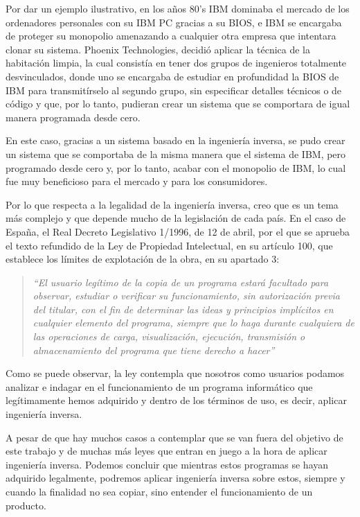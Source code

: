 Por dar un ejemplo ilustrativo, en los años 80's IBM dominaba el mercado de los ordenadores personales
con su IBM PC gracias a su BIOS, e IBM se encargaba de proteger su monopolio amenazando a cualquier otra
empresa que intentara clonar su sistema. Phoenix Technologies, decidió aplicar la técnica de la habitación
limpia, la cual consistía en tener dos grupos de ingenieros totalmente desvinculados, donde uno se encargaba
de estudiar en profundidad la BIOS de IBM para transmitírselo al segundo grupo, sin especificar detalles
técnicos o de código y que, por lo tanto, pudieran crear un sistema que se comportara de igual manera programada
desde cero. \cite{IngenieriaInversa}

En este caso, gracias a un sistema basado en la ingeniería inversa, se pudo crear un sistema que se comportaba
de la misma manera que el sistema de IBM, pero programado desde cero y, por lo tanto, acabar con el monopolio
de IBM, lo cual fue muy beneficioso para el mercado y para los consumidores.

Por lo que respecta a la legalidad de la ingeniería inversa, creo que es un tema más complejo y que depende
mucho de la legislación de cada país. En el caso de España, el Real Decreto Legislativo 1/1996, de 12 de abril,
por el que se aprueba el texto refundido de la Ley de Propiedad Intelectual, en su artículo 100, que establece
los límites de explotación de la obra, en su apartado 3\cite{LeyPropiedadIntelectual}: 

\begin{quote}
    \textit{``El usuario legítimo de la copia de un programa estará facultado para observar, estudiar o 
    verificar su funcionamiento, sin autorización previa del titular, con el fin de determinar las ideas
    y principios implícitos en cualquier elemento del programa, siempre que lo haga durante cualquiera de
    las operaciones de carga, visualización, ejecución, transmisión o almacenamiento del programa que tiene
    derecho a hacer''}
\end{quote}

Como se puede observar, la ley contempla que nosotros como usuarios podamos analizar e indagar en el funcionamiento
de un programa informático que legítimamente hemos adquirido y dentro de los términos de uso, es decir, aplicar
ingeniería inversa.

A pesar de que hay muchos casos a contemplar que se van fuera del objetivo de este trabajo y de muchas más leyes
que entran en juego a la hora de aplicar ingeniería inversa. Podemos concluir que mientras estos programas se hayan
adquirido legalmente, podremos aplicar ingeniería inversa sobre estos, siempre y cuando la finalidad no sea copiar,
sino entender el funcionamiento de un producto.

